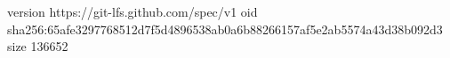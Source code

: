 version https://git-lfs.github.com/spec/v1
oid sha256:65afe3297768512d7f5d4896538ab0a6b88266157af5e2ab5574a43d38b092d3
size 136652

